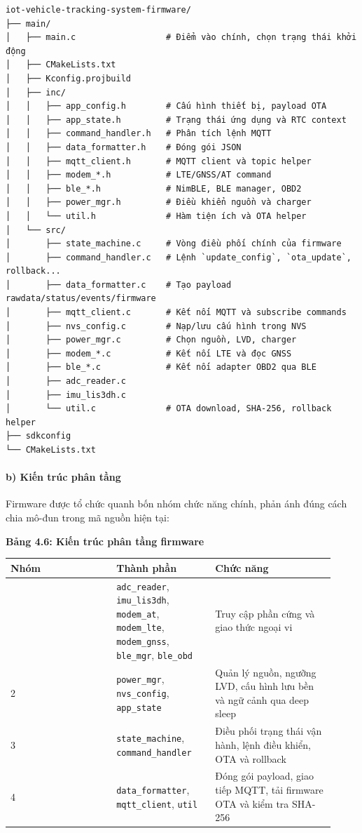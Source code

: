 \documentclass[13pt,a4paper]{extarticle}
\newcounter{none} %
\newcommand{\thesislongtableorignewline}{}
\let\thesislongtableorignewline\\
\renewcommand{\\}{\thesislongtableorignewline\hline}%
\let\\\thesislongtableorignewline
\newcommand{\thesistabletitle}[1]{%
  \begin{center}\textbf{#1}\end{center}%
}
\begin{document}
\begin{verbatim}
iot-vehicle-tracking-system-firmware/
├── main/
│   ├── main.c                  # Điểm vào chính, chọn trạng thái khởi động
│   ├── CMakeLists.txt
│   ├── Kconfig.projbuild
│   ├── inc/
│   │   ├── app_config.h        # Cấu hình thiết bị, payload OTA
│   │   ├── app_state.h         # Trạng thái ứng dụng và RTC context
│   │   ├── command_handler.h   # Phân tích lệnh MQTT
│   │   ├── data_formatter.h    # Đóng gói JSON
│   │   ├── mqtt_client.h       # MQTT client và topic helper
│   │   ├── modem_*.h           # LTE/GNSS/AT command
│   │   ├── ble_*.h             # NimBLE, BLE manager, OBD2
│   │   ├── power_mgr.h         # Điều khiển nguồn và charger
│   │   └── util.h              # Hàm tiện ích và OTA helper
│   └── src/
│       ├── state_machine.c     # Vòng điều phối chính của firmware
│       ├── command_handler.c   # Lệnh `update_config`, `ota_update`, rollback...
│       ├── data_formatter.c    # Tạo payload rawdata/status/events/firmware
│       ├── mqtt_client.c       # Kết nối MQTT và subscribe commands
│       ├── nvs_config.c        # Nạp/lưu cấu hình trong NVS
│       ├── power_mgr.c         # Chọn nguồn, LVD, charger
│       ├── modem_*.c           # Kết nối LTE và đọc GNSS
│       ├── ble_*.c             # Kết nối adapter OBD2 qua BLE
│       ├── adc_reader.c
│       ├── imu_lis3dh.c
│       └── util.c              # OTA download, SHA-256, rollback helper
├── sdkconfig
└── CMakeLists.txt
\end{verbatim}

\paragraph{b) Kiến trúc phân
tầng}\label{b-kiux1ebfn-truxfac-phuxe2n-tux1ea7ng}

Firmware được tổ chức quanh bốn nhóm chức năng chính, phản ánh đúng cách
chia mô-đun trong mã nguồn hiện tại:

\thesistabletitle{Bảng 4.6: Kiến trúc phân tầng firmware}

{\def\LTcaptype{none} %
\begin{longtable}{|p{0.30\linewidth}|p{0.28\linewidth}|p{0.34\linewidth}|}
\hline \textbf{Nhóm} & \textbf{Thành phần} & \textbf{Chức năng} \\
\hline
\endhead
\hline
\endlastfoot
1 & \texttt{adc\_reader}, \texttt{imu\_lis3dh}, \texttt{modem\_at},
\texttt{modem\_lte}, \texttt{modem\_gnss}, \texttt{ble\_mgr},
\texttt{ble\_obd} & Truy cập phần cứng và giao thức ngoại vi \\
2 & \texttt{power\_mgr}, \texttt{nvs\_config}, \texttt{app\_state} &
Quản lý nguồn, ngưỡng LVD, cấu hình lưu bền và ngữ cảnh qua deep
sleep \\
3 & \texttt{state\_machine}, \texttt{command\_handler} & Điều phối trạng
thái vận hành, lệnh điều khiển, OTA và rollback \\
4 & \texttt{data\_formatter}, \texttt{mqtt\_client}, \texttt{util} &
Đóng gói payload, giao tiếp MQTT, tải firmware OTA và kiểm tra
SHA-256 \\
\end{longtable}
}
\end{document}
